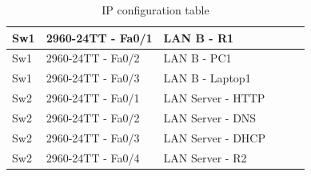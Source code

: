 \documentclass[11pt,a4paper]{report}
\begin{document}
\begin{table}[]
\begin{tabular}{llllll}
Sw1                                       & 2960-24TT - Fa0/1                           & LAN B - R1                                   &                                         &                                                  &                                              \\ \hline
Sw1                                       & 2960-24TT - Fa0/2                           & LAN B - PC1                                  &                                         &                                                  &                                              \\ \hline
Sw1                                       & 2960-24TT - Fa0/3                           & LAN B - Laptop1                              &                                         &                                                  &                                              \\ \hline
Sw2                                       & 2960-24TT - Fa0/1                           & LAN Server - HTTP                            &                                         &                                                  &                                              \\ \hline
Sw2                                       & 2960-24TT - Fa0/2                           & LAN Server - DNS                             &                                         &                                                  &                                              \\ \hline
Sw2                                       & 2960-24TT - Fa0/3                           & LAN Server - DHCP                            &                                         &                                                  &                                              \\ \hline
Sw2                                       & 2960-24TT - Fa0/4                           & LAN Server - R2                              &                                         &                                                  &                                              \\ \hline
\end{tabular}
\caption{IP configuration table}
\label{tab:deviceiptable}
\end{table}

\end{document}
